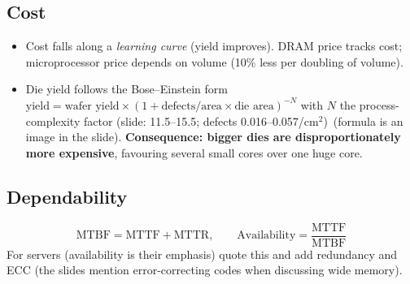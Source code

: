 \subsection{Cost}
\begin{itemize}
\item Cost falls along a \emph{learning curve} (yield improves). DRAM price tracks cost; microprocessor price depends on volume (10\% less per doubling of volume).
\item Die yield follows the Bose--Einstein form $\text{yield}=\text{wafer yield}\times(1+\text{defects/area}\times\text{die area})^{-N}$ with $N$ the process-complexity factor (slide: 11.5--15.5; defects 0.016--0.057/cm$^2$)\bs\ (formula is an image in the slide). \textbf{Consequence: bigger dies are disproportionately more expensive}, favouring several small cores over one huge core.
\end{itemize}

\subsection{Dependability}
\[
\text{MTBF}=\text{MTTF}+\text{MTTR},\qquad \text{Availability}=\frac{\text{MTTF}}{\text{MTBF}}
\]
For servers (availability is their emphasis) quote this and add redundancy and ECC (the slides mention error-correcting codes when discussing wide memory). 

